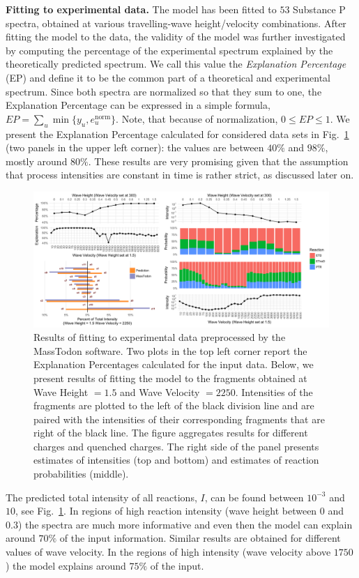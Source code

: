 \documentclass{llncs}
\begin{document}
\textbf{Fitting to experimental data.} The model has been fitted to $53$ Substance P spectra, obtained at various travelling-wave height/velocity combinations. After fitting the model to the data, the validity of the model was further investigated by computing the percentage of the experimental spectrum explained by the theoretically predicted spectrum. We call this value the \textit{Explanation Percentage} (EP) and define it to be the common part of a theoretical and experimental spectrum. Since both spectra are normalized so that they sum to one, the Explanation Percentage can be expressed in a simple formula,
$ EP = \sum_u \min\{y_u, e_u^\text{norm}\}.$
Note, that because of normalization, $0 \leq EP \leq 1$. We present the Explanation Percentage calculated for considered data sets in Fig.~\ref{fig::melon} (two panels in the upper left corner): the values are between $40\%$ and $98\%$, mostly around $80\%$. These results are very promising given that the assumption that process intensities are constant in time is rather strict, as discussed later on.

\begin{figure}[h]
        \center
        \includegraphics[width=1.1\textwidth]{melon.png}
        \caption{ Results of fitting to experimental data preprocessed by the {\sc MassTodon} software. Two plots in the top left corner report the Explanation Percentages calculated for the input data. Below, we present results of fitting the model to the fragments obtained at Wave Height $= 1.5$ and Wave Velocity $= 2250$. Intensities of the  fragments are plotted to the left of the black division line and are paired with the intensities of their corresponding  fragments that are right of the black line. The figure aggregates results for different charges and quenched charges. The right side of the panel presents estimates of intensities (top and bottom) and estimates of reaction probabilities (middle).
        }\label{fig::melon}
\end{figure}
The predicted total intensity of all reactions, $I$, can be found between $10^{-3}$ and $10$, see Fig.~\ref{fig::melon}. In regions of high reaction intensity (wave height between $0$ and $0.3$) the spectra are much more informative and even then the model can explain around $70\%$ of the input information. Similar results are obtained for different values of wave velocity. In the regions of high intensity (wave velocity above $1750$) the model explains around $75\%$ of the input.
\end{document}
